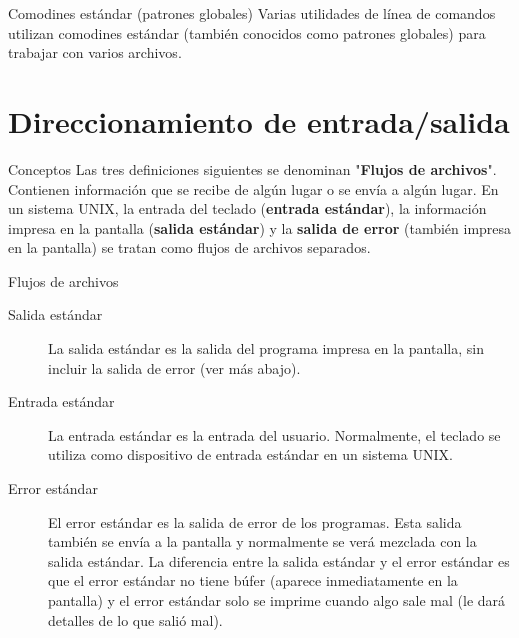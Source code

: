 \begin{frame}[c]{Comodines estándar (patrones globales)}
  Varias utilidades de línea de comandos utilizan comodines estándar
  (también conocidos como patrones globales) para trabajar con varios
  archivos.

\end{frame}

\section{Direccionamiento de entrada/salida}

\begin{frame}[c]{Conceptos}
  Las tres definiciones siguientes se denominan "\textbf{Flujos de archivos}".
  Contienen información que se recibe de algún lugar o se envía a algún lugar.
  En un sistema UNIX, la entrada del teclado (\textbf{entrada estándar}),
  la información impresa en la pantalla (\textbf{salida estándar}) y la
  \textbf{salida de error} (también impresa en la pantalla) se tratan como
  flujos de archivos separados.
\end{frame}

\begin{frame}[c]{Flujos de archivos}
  \begin{description}
    \item[Salida estándar] 
      La salida estándar es la salida del programa impresa en la pantalla,
      sin incluir la salida de error (ver más abajo).
    \pausa
    \vspace{\baselineskip}
    \item[Entrada estándar]
      La entrada estándar es la entrada del usuario. Normalmente, el teclado
      se utiliza como dispositivo de entrada estándar en un sistema UNIX.
    \pausa
    \vspace{\baselineskip}
    \item[Error estándar]
      El error estándar es la salida de error de los programas. Esta salida
      también se envía a la pantalla y normalmente se verá mezclada con la
      salida estándar. La diferencia entre la salida estándar y el error
      estándar es que el error estándar no tiene búfer (aparece
      inmediatamente en la pantalla) y el error estándar solo se imprime
      cuando algo sale mal (le dará detalles de lo que salió mal).
  \end{description}
\end{frame}


